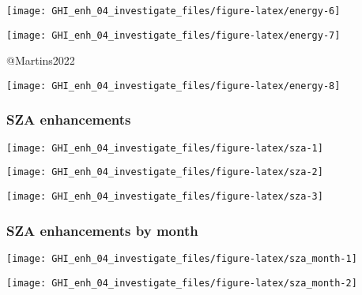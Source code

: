 \documentclass[
  10pt,
  a4paper,oneside]{article}
\begin{document}
\begin{center}\texttt{[image: GHI\_enh\_04\_investigate\_files/figure-latex/energy-6]} \end{center}

\begin{center}\texttt{[image: GHI\_enh\_04\_investigate\_files/figure-latex/energy-7]} \end{center}

@Martins2022

\begin{center}\texttt{[image: GHI\_enh\_04\_investigate\_files/figure-latex/energy-8]} \end{center}

\newpage
\FloatBarrier

\hypertarget{sza-enhancements}{%
\subsubsection{SZA enhancements}\label{sza-enhancements}}

\begin{center}\texttt{[image: GHI\_enh\_04\_investigate\_files/figure-latex/sza-1]} \end{center}

\begin{center}\texttt{[image: GHI\_enh\_04\_investigate\_files/figure-latex/sza-2]} \end{center}

\begin{center}\texttt{[image: GHI\_enh\_04\_investigate\_files/figure-latex/sza-3]} \end{center}

\newpage
\FloatBarrier

\hypertarget{sza-enhancements-by-month}{%
\subsubsection{SZA enhancements by month}\label{sza-enhancements-by-month}}

\begin{center}\texttt{[image: GHI\_enh\_04\_investigate\_files/figure-latex/sza\_month-1]} \end{center}

\begin{center}\texttt{[image: GHI\_enh\_04\_investigate\_files/figure-latex/sza\_month-2]} \end{center}
\end{document}
